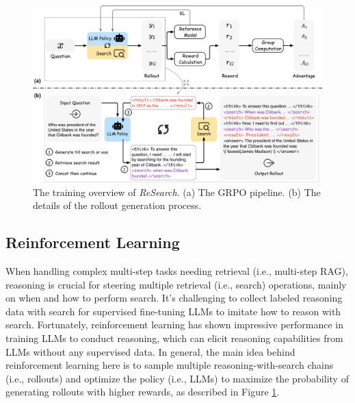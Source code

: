 \documentclass{article}
\begin{document}
\begin{figure}[htbp]
  \centering
  \includegraphics[width=\textwidth]{fig/method.pdf}
  \caption{The training overview of \textit{ReSearch}. (a) The GRPO pipeline. (b) The details of the rollout generation process.}
  \label{fig:method}
\end{figure}

\subsection{Reinforcement Learning}
\label{sec:method-rl}

When handling complex multi-step tasks needing retrieval (i.e., multi-step RAG), reasoning is crucial for steering multiple retrieval (i.e., search) operations, mainly on when and how to perform search. It's challenging to collect labeled reasoning data with search for supervised fine-tuning LLMs to imitate how to reason with search.
Fortunately, reinforcement learning has shown impressive performance in training LLMs to conduct reasoning, which can elicit reasoning capabilities from LLMs without any supervised data. 
In general, the main idea behind reinforcement learning here is to sample multiple reasoning-with-search chains (i.e., rollouts) and optimize the policy (i.e., LLMs) to maximize the probability of generating rollouts with higher rewards, as described in Figure \ref{fig:method}.
\end{document}
